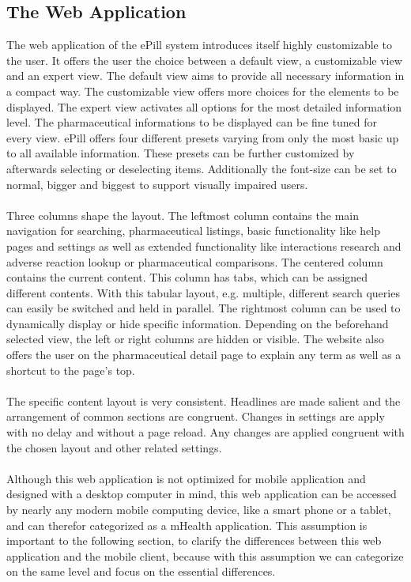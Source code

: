\subsection{The Web Application}
The web application of the ePill system introduces itself highly customizable to the user. It offers the user the choice between a default view, a customizable view and an expert view. The default view aims to provide all necessary information in a compact way. The customizable view offers more choices for the elements to be displayed. The expert view activates all options for the most detailed information level. The pharmaceutical informations to be displayed can be fine tuned for every view. ePill offers four different presets varying from only the most basic up to all available information. These presets can be further customized by afterwards selecting or deselecting items. Additionally the font-size can be set to normal, bigger and biggest to support visually impaired users.
\\
\\
Three columns shape the layout. The leftmost column contains the main navigation for searching, pharmaceutical listings, basic functionality like help pages and settings as well as extended functionality like interactions research and adverse reaction lookup or pharmaceutical comparisons. The centered column contains the current content. This column has tabs, which can be assigned different contents. With this tabular layout, e.g. multiple, different search queries can easily be switched and held in parallel. The rightmost column can be used to dynamically display or hide specific information. Depending on the beforehand selected view, the left or right columns are hidden or visible. The website also offers the user on the pharmaceutical detail page to explain any term as well as a shortcut to the page's top.
\\
\\
The specific content layout is very consistent. Headlines are made salient and the arrangement of common sections are congruent. Changes in settings are apply with no delay and without a page reload. Any changes are applied congruent with the chosen layout and other related settings.
\\
\\
Although this web application is not optimized for mobile application and designed with a desktop computer in mind, this web application can be accessed by nearly any modern mobile computing device, like a smart phone or a tablet, and can therefor categorized as a mHealth application. This assumption is important to the following section, to clarify the differences between this web application and the mobile client, because with this assumption we can categorize on the same level and focus on the essential differences.